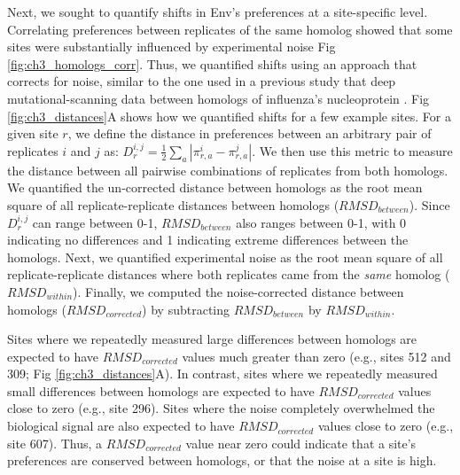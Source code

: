 \documentclass[9pt,lineno]{elife}
\begin{document}
Next, we sought to quantify shifts in Env's preferences at a site-specific level.
Correlating preferences between replicates of the same homolog showed that some sites were substantially influenced by experimental noise Fig \ref{fig:ch3_homologs_corr}.
Thus, we quantified shifts using an approach that corrects for noise, similar to the one used in a previous study that deep mutational-scanning data between homologs of influenza's nucleoprotein \cite{doud2015site}.
Fig \ref{fig:ch3_distances}A shows how we quantified shifts for a few example sites.
For a given site $r$, we define the distance in preferences between an arbitrary pair of replicates $i$ and $j$ as: $D_{r}^{i,j} = \frac{1}{2}\sum_{a}|\pi_{r,a}^{i}-\pi_{r,a}^{j}|$.
We then use this metric to measure the distance between all pairwise combinations of replicates from both homologs.
We quantified the un-corrected distance between homologs as the root mean square of all replicate-replicate distances between homologs ($RMSD_{between}$).
Since $D_{r}^{i,j}$ can range between 0-1, $RMSD_{between}$ also ranges between 0-1, with 0 indicating no differences and 1 indicating extreme differences between the homologs.
Next, we quantified experimental noise as the root mean square of all replicate-replicate distances where both replicates came from the \textit{same} homolog ($RMSD_{within}$).
Finally, we computed the noise-corrected distance between homologs ($RMSD_{corrected}$) by subtracting $RMSD_{between}$ by $RMSD_{within}$.

Sites where we repeatedly measured large differences between homologs are expected to have $RMSD_{corrected}$ values much greater than zero (e.g., sites 512 and 309; Fig \ref{fig:ch3_distances}A).
In contrast, sites where we repeatedly measured small differences between homologs are expected to have $RMSD_{corrected}$ values close to zero (e.g., site 296).
Sites where the noise completely overwhelmed the biological signal are also expected to have $RMSD_{corrected}$ values close to zero (e.g., site 607).
Thus, a $RMSD_{corrected}$ value near zero could indicate that a site's preferences are conserved between homologs, or that the noise at a site is high.
\end{document}
